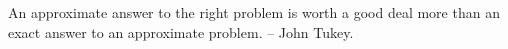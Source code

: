 \documentclass{exam}
\newcommand{\showallanswers}{\par\unvbox\allanswers}
\begin{document}
 \vspace{2.5cm}

\begin{center}
An approximate answer to the right problem is worth a good deal more than an exact answer to an approximate problem. – John Tukey.
\end{center}


\end{document}
